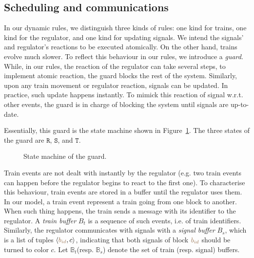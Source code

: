\documentclass[runningheads]{llncs}
\newcommand{\tuple}[1]{\ensuremath{\langle #1\rangle}}
\newcommand{\posFmt}[1]{{\color{poscolor}{#1}}}
\newcommand{\bid}[1]{\ensuremath{\posFmt{b_{#1}}}}
\newcommand{\guardFmt}[1]{{\color{guardcolor} \ensuremath{\mathtt{#1}}}}
\newcommand{\guardT}{\guardFmt{T}}
\newcommand{\guardS}{\guardFmt{S}}
\newcommand{\guardR}{\guardFmt{R}}
\newcommand{\bufferFmt}[1]{#1}
\newcommand{\bufTrainSet}{\ensuremath{\bufferFmt{\mathbb{B}_t}}\xspace}
\newcommand{\bufSigSet}{\ensuremath{\bufferFmt{\mathbb{B}_s}}\xspace}
\newcommand{\bufTrain}{\ensuremath{\bufferFmt{B_t}}\xspace}
\newcommand{\bufSig}{\ensuremath{\bufferFmt{B_s}}\xspace}
\begin{document}

\subsection{Scheduling and communications}

In our dynamic rules, we distinguish three kinds of rules: one kind for trains, one kind for the regulator, and one kind for updating signals. We intend the signals' and regulator's reactions to be executed atomically. On the other hand, trains evolve much slower. To reflect this behaviour in our rules, we introduce a \emph{guard}. While, in our rules, the reaction of the regulator can take several steps, to implement atomic reaction, the guard blocks the rest of the system. Similarly, upon any train movement or regulator reaction, signals can be updated. In practice, such update happens instantly. To mimick this reaction of signal w.r.t. other events, the guard is in charge of blocking the system until signals are up-to-date.

Essentially, this guard is the state machine shown in Figure~\ref{fig:state_machine_guard}. The three states of the guard are \guardR, \guardS, and \guardT.

\begin{figure}
	\centering
	\caption{State machine of the guard.}
	\label{fig:state_machine_guard}
\end{figure}

Train events are not dealt with instantly by the regulator (e.g. two train events can happen before the regulator begins to react to the first one). To characterise this behaviour, train events are stored in a buffer until the regulator uses them. In our model, a train event represent a train going from one block to another. When such thing happens, the train sends a message with its identifier to the regulator. A \emph{train buffer} \bufTrain is a sequence of such events, i.e. of train identifiers.
Similarly, the regulator communicates with signals with a \emph{signal buffer} \bufSig, which is a list of tuples $\tuple{\bid{id}, c}$, indicating that both signals of block $\bid{id}$ should be turned to color $c$. Let \bufTrainSet (resp. \bufSigSet) denote the set of train (resp. signal) buffers.
\end{document}
